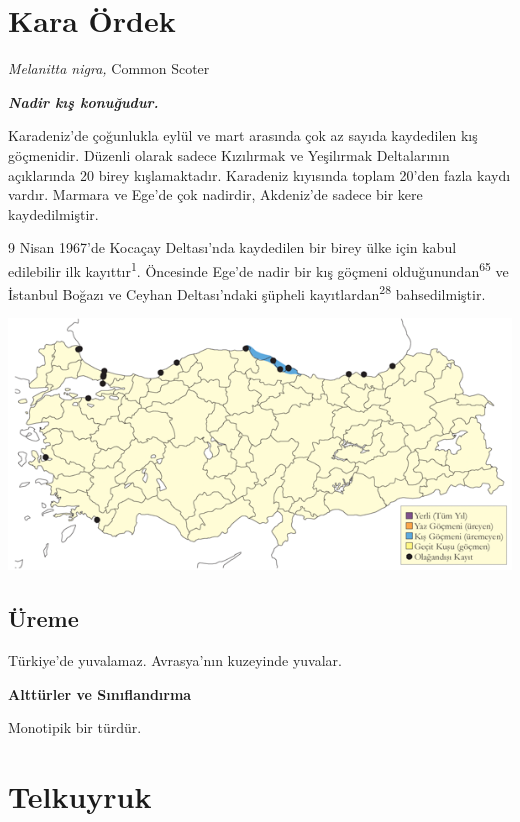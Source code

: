 \documentclass[
  letterpaper,
  DIV=11,
  numbers=noendperiod]{scrreprt}
\begin{document}
\hypertarget{kara-uxf6rdek}{%
\section{Kara Ördek}\label{kara-uxf6rdek}}

\emph{Melanitta nigra,} Common Scoter

\textbf{\emph{Nadir kış konuğudur.}}

Karadeniz'de çoğunlukla eylül ve mart arasında çok az sayıda kaydedilen
kış göçmenidir. Düzenli olarak sadece Kızılırmak ve Yeşilırmak
Deltalarının açıklarında 20 birey kışlamaktadır. Karadeniz kıyısında
toplam 20'den fazla kaydı vardır. Marmara ve Ege'de çok nadirdir,
Akdeniz'de sadece bir kere kaydedilmiştir.

9 Nisan 1967'de Kocaçay Deltası'nda kaydedilen bir birey ülke için kabul
edilebilir ilk kayıttır\textsuperscript{1}. Öncesinde Ege'de nadir bir
kış göçmeni olduğunundan\textsuperscript{65} ve İstanbul Boğazı ve
Ceyhan Deltası'ndaki şüpheli kayıtlardan\textsuperscript{28}
bahsedilmiştir.

\includegraphics{images/harita_Page_029.png}

\hypertarget{uxfcreme-28}{%
\subsection{\texorpdfstring{\textbf{Üreme}}{Üreme}}\label{uxfcreme-28}}

Türkiye'de yuvalamaz. Avrasya'nın kuzeyinde yuvalar.

\textbf{Alttürler ve Sınıflandırma}

Monotipik bir türdür.

\hypertarget{telkuyruk}{%
\section{Telkuyruk}\label{telkuyruk}}
\end{document}
